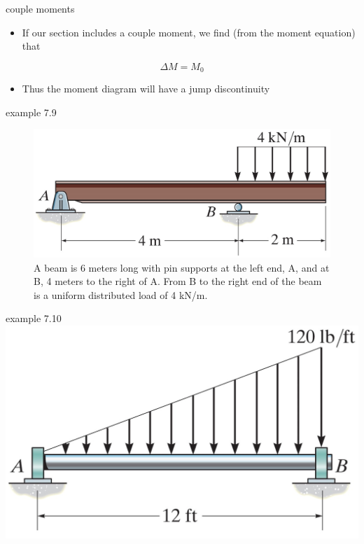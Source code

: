 \begin{frame}{couple moments}
\protect\hypertarget{couple-moments}{}
\begin{itemize}
\tightlist
\item
  If our section includes a couple moment, we find (from the moment
  equation) that
\end{itemize}

\[\Delta M = M_0 \]

\begin{itemize}
\tightlist
\item
  Thus the moment diagram will have a jump discontinuity
\end{itemize}
\end{frame}

\begin{frame}{example 7.9}
\protect\hypertarget{example-7.9}{}
\begin{figure}
\centering
\includegraphics{../images/example-7-9.jpg}
\caption{A beam is 6 meters long with pin supports at the left end, A,
and at B, 4 meters to the right of A. From B to the right end of the
beam is a uniform distributed load of 4 kN/m.}
\end{figure}
\end{frame}

\begin{frame}{example 7.10}
\protect\hypertarget{example-7.10}{}
\includegraphics{../images/example-7-10.jpg}
\end{frame}

